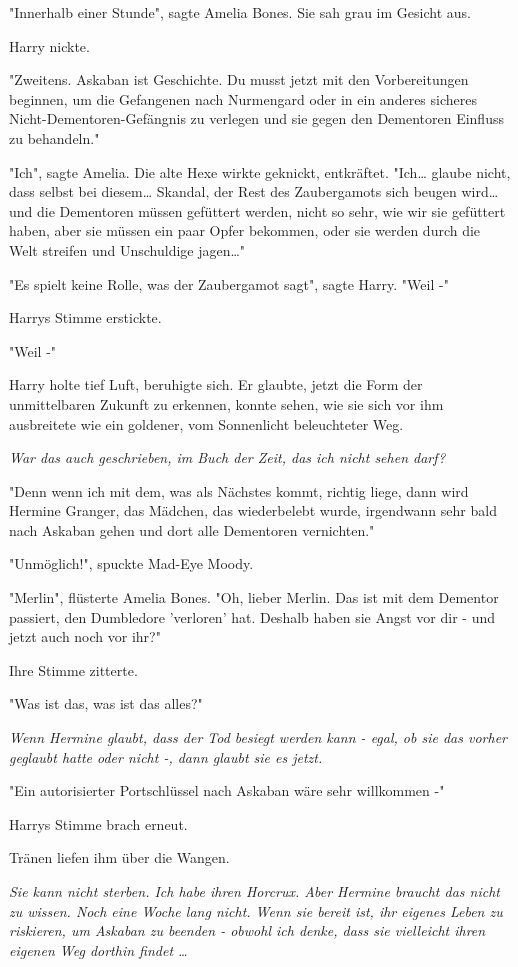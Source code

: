 {"Innerhalb einer Stunde", sagte Amelia Bones. Sie sah grau im Gesicht aus.

Harry nickte.

"Zweitens. Askaban ist Geschichte. Du musst jetzt mit den Vorbereitungen beginnen, um die Gefangenen nach Nurmengard oder in ein anderes sicheres Nicht-Dementoren-Gefängnis zu verlegen und sie gegen den Dementoren Einfluss zu behandeln."

"Ich", sagte Amelia. Die alte Hexe wirkte geknickt, entkräftet. "Ich… glaube nicht, dass selbst bei diesem… Skandal, der Rest des Zaubergamots sich beugen wird… und die Dementoren müssen gefüttert werden, nicht so sehr, wie wir sie gefüttert haben, aber sie müssen ein paar Opfer bekommen, oder sie werden durch die Welt streifen und Unschuldige jagen…"

"Es spielt keine Rolle, was der Zaubergamot sagt", sagte Harry. "Weil -"

Harrys Stimme erstickte.

"Weil -"

Harry holte tief Luft, beruhigte sich. Er glaubte, jetzt die Form der unmittelbaren Zukunft zu erkennen, konnte sehen, wie sie sich vor ihm ausbreitete wie ein goldener, vom Sonnenlicht beleuchteter Weg.

\emph{War das auch geschrieben, im Buch der Zeit, das ich nicht sehen darf?}

"Denn wenn ich mit dem, was als Nächstes kommt, richtig liege, dann wird Hermine Granger, das Mädchen, das wiederbelebt wurde, irgendwann sehr bald nach Askaban gehen und dort alle Dementoren vernichten."

"Unmöglich!", spuckte Mad-Eye Moody.

"Merlin", flüsterte Amelia Bones. "Oh, lieber Merlin. Das ist mit dem Dementor passiert, den Dumbledore 'verloren' hat. Deshalb haben sie Angst vor dir - und jetzt auch noch vor ihr?"

Ihre Stimme zitterte.

"Was ist das, was ist das alles?"

\emph{Wenn Hermine glaubt, dass der Tod besiegt werden kann - egal, ob sie das vorher geglaubt hatte oder nicht -, dann glaubt sie es jetzt.}

"Ein autorisierter Portschlüssel nach Askaban wäre sehr willkommen -"

Harrys Stimme brach erneut.

Tränen liefen ihm über die Wangen.

\emph{Sie kann nicht sterben. Ich habe ihren Horcrux. Aber Hermine braucht das nicht zu wissen. Noch eine Woche lang nicht. Wenn sie bereit ist, ihr eigenes Leben zu riskieren, um Askaban zu beenden - obwohl ich denke, dass sie vielleicht ihren eigenen Weg dorthin findet …}

}
